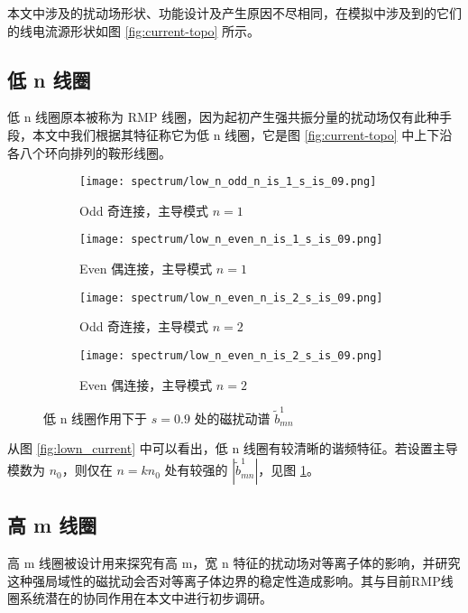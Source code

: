 本文中涉及的扰动场形状、功能设计及产生原因不尽相同，在模拟中涉及到的它们的线电流源形状如图 \ref{fig:current-topo} 所示。

\subsection{低 n 线圈}
低 n 线圈原本被称为 RMP 线圈，因为起初产生强共振分量的扰动场仅有此种手段，本文中我们根据其特征称它为低 n 线圈，它是图 \ref{fig:current-topo} 中上下沿各八个环向排列的鞍形线圈。


\begin{figure}[htbp]
  \centering%
  \begin{subfigure}{0.45\textwidth}
    \texttt{[image: spectrum/low\_n\_odd\_n\_is\_1\_s\_is\_09.png]}
    \caption{Odd 奇连接，主导模式 $n=1$}
  \end{subfigure}%
  \begin{subfigure}{0.45\textwidth}
    \texttt{[image: spectrum/low\_n\_even\_n\_is\_1\_s\_is\_09.png]}
    \caption{Even 偶连接，主导模式 $n=1$}
  \end{subfigure}
  
  \begin{subfigure}{0.45\textwidth}
    \texttt{[image: spectrum/low\_n\_even\_n\_is\_2\_s\_is\_09.png]}
    \caption{Odd 奇连接，主导模式 $n=2$}
  \end{subfigure}
  \begin{subfigure}{0.45\textwidth}
    \texttt{[image: spectrum/low\_n\_even\_n\_is\_2\_s\_is\_09.png]}
    \caption{Even 偶连接，主导模式 $n=2$}
  \end{subfigure}
  \caption{低 n 线圈作用下于 $s=0.9$ 处的磁扰动谱 $\tilde{b}^1_{mn}$}
  \label{fig:lown-spectrum-subfig}
\end{figure}


从图 \ref{fig:lown_current} 中可以看出，低 n 线圈有较清晰的谐频特征。若设置主导模数为 $n_0$，则仅在 $n=kn_0$ 处有较强的 $|\tilde{b}^1_{mn}|$，见图 \ref{fig:lown-spectrum-subfig}。

\subsection{高 m 线圈}

高 m 线圈被设计用来探究有高 m，宽 n 特征的扰动场对等离子体的影响，并研究这种强局域性的磁扰动会否对等离子体边界的稳定性造成影响。其与目前RMP线圈系统潜在的协同作用在本文中进行初步调研。



